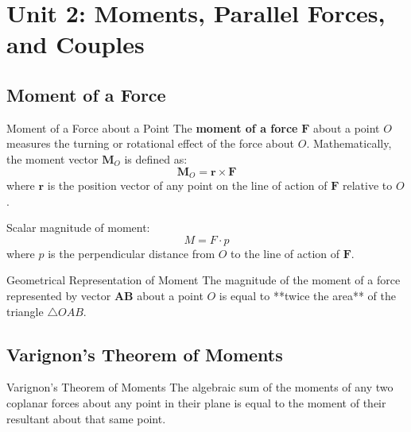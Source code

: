 \documentclass[11pt,a4paper]{article}
\begin{document}
\section{Unit 2: Moments, Parallel Forces, and Couples}

\subsection{Moment of a Force}

\begin{definitionbox}{Moment of a Force about a Point}
The \textbf{moment of a force} $\mathbf{F}$ about a point $O$ measures the turning or rotational effect of the force about $O$.
Mathematically, the moment vector $\mathbf{M}_O$ is defined as:
\begin{equation}
\mathbf{M}_O = \mathbf{r} \times \mathbf{F}
\end{equation}
where $\mathbf{r}$ is the position vector of any point on the line of action of $\mathbf{F}$ relative to $O$.

Scalar magnitude of moment:
\begin{equation}
M = F \cdot p
\end{equation}
where $p$ is the perpendicular distance from $O$ to the line of action of $\mathbf{F}$.
\end{definitionbox}

\begin{theorembox}{Geometrical Representation of Moment}
The magnitude of the moment of a force represented by vector $\mathbf{AB}$ about a point $O$ is equal to **twice the area** of the triangle $\triangle OAB$.
\end{theorembox}

\subsection{Varignon's Theorem of Moments}

\begin{theorembox}{Varignon's Theorem of Moments}
The algebraic sum of the moments of any two coplanar forces about any point in their plane is equal to the moment of their resultant about that same point.
\end{theorembox}
\end{document}
